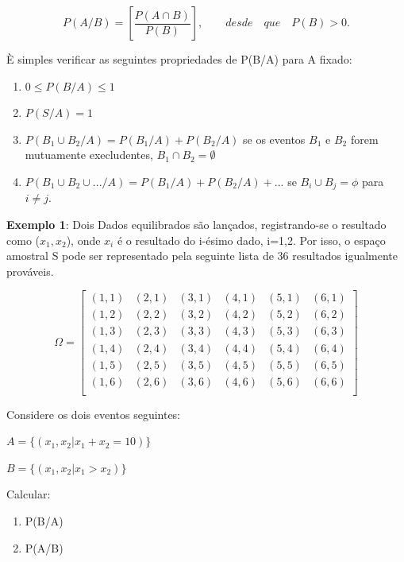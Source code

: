 \begin{equation}\label{}
    P(A/B) = \left[ \frac{P(A \cap B)}{P(B)} \right], \quad \quad desde \quad que
    \quad P(B)>0.
\end{equation}

È simples verificar as seguintes propriedades de P(B/A) para A
fixado:

\begin{enumerate}
    \item $0 \leq P(B/A) \leq 1$
    \item $P(S/A)=1$
     \item $P(B_{1} \cup B_{2}/A) = P(B_{1}/A)+P(B_{2}/A)$ se os
     eventos $B_{1}$ e $B_{2}$ forem mutuamente execludentes, $B_{1}\cap B_{2}=\emptyset$
     \item $P(B_{1} \cup B_{2} \cup ... / A) =
     P(B_{1}/A)+P(B_{2}/A)+...$ se $B_{i}\cup B_{j}=\phi$ para $i\neq
     j$.
\end{enumerate}



\textbf{Exemplo 1}: Dois Dados equilibrados são lançados,
registrando-se o resultado como ($x_{1},x_{2}$), onde $x_{i}$ é o
resultado do i-ésimo dado, i=1,2. Por isso, o espaço amostral S
pode ser representado pela seguinte lista de 36 resultados
igualmente prováveis.


$$
\Omega =
\left[%
\begin{array}{cccccc}
  (1,1) & (2,1) & (3,1) & (4,1) & (5,1) & (6,1) \\
  (1,2) & (2,2) & (3,2) & (4,2) & (5,2) & (6,2) \\
  (1,3) & (2,3) & (3,3) & (4,3) & (5,3) & (6,3) \\
  (1,4) & (2,4) & (3,4) & (4,4) & (5,4) & (6,4) \\
  (1,5) & (2,5) & (3,5) & (4,5) & (5,5) & (6,5) \\
  (1,6) & (2,6) & (3,6) & (4,6) & (5,6) & (6,6) \\
\end{array}%
\right]
$$

Considere os dois eventos seguintes:\vskip0.3cm

$A=\{(x_{1},x_{2}|x_{1}+x_{2}=10)\}$

$B=\{(x_{1},x_{2}|x_{1}>x_{2})\}$

\vskip0.3cm

Calcular:

\begin{enumerate}
    \item P(B/A)
    \item P(A/B)
\end{enumerate}


